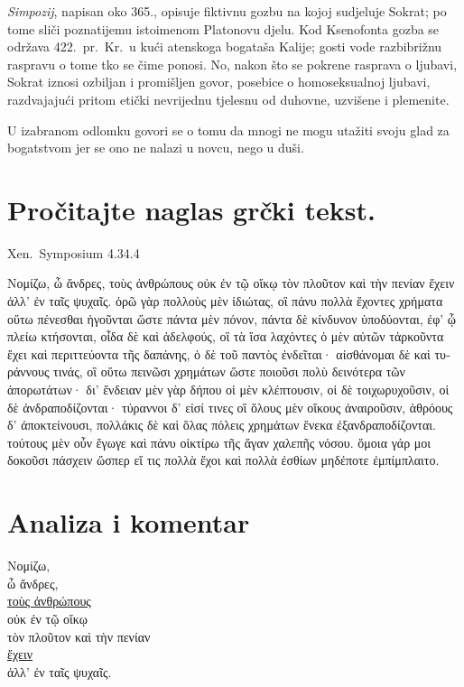 \textit{Simpozij}, napisan oko 365., opisuje fiktivnu gozbu na kojoj sudjeluje Sokrat; po tome sliči poznatijemu istoimenom Platonovu djelu. Kod Ksenofonta gozba se održava 422.\ pr.~Kr.\ u kući atenskoga bogataša Kalije; gosti vode razbibrižnu raspravu o tome tko se čime ponosi. No, nakon što se pokrene rasprava o ljubavi, Sokrat iznosi ozbiljan i promišljen govor, posebice o homoseksualnoj ljubavi, razdvajajući pritom etički nevrijednu tjelesnu od duhovne, uzvišene i plemenite. 

U izabranom odlomku govori se o tomu da mnogi ne mogu utažiti svoju glad za bogatstvom jer se ono ne nalazi u novcu, nego u duši.


\section*{Pročitajte naglas grčki tekst.}

Xen.\ Symposium 4.34.4


\medskip

{\large
\begin{greek}
\noindent Νομίζω, ὦ ἄνδρες, τοὺς ἀνθρώπους οὐκ ἐν τῷ οἴκῳ τὸν πλοῦτον καὶ τὴν πενίαν ἔχειν ἀλλ' ἐν ταῖς ψυχαῖς. ὁρῶ γὰρ πολλοὺς μὲν ἰδιώτας, οἳ πάνυ πολλὰ ἔχοντες χρήματα οὕτω πένεσθαι ἡγοῦνται ὥστε πάντα μὲν πόνον, πάντα δὲ κίνδυνον ὑποδύονται, ἐφ' ᾧ πλείω κτήσονται, οἶδα δὲ καὶ ἀδελφούς, οἳ τὰ ἴσα λαχόντες ὁ μὲν αὐτῶν τἀρκοῦντα ἔχει καὶ περιττεύοντα τῆς δαπάνης, ὁ δὲ τοῦ παντὸς ἐνδεῖται· αἰσθάνομαι δὲ καὶ τυράννους τινάς, οἳ οὕτω πεινῶσι χρημάτων ὥστε ποιοῦσι πολὺ δεινότερα τῶν ἀπορωτάτων· δι' ἔνδειαν μὲν γὰρ δήπου οἱ μὲν κλέπτουσιν, οἱ δὲ τοιχωρυχοῦσιν, οἱ δὲ ἀνδραποδίζονται· τύραννοι δ' εἰσί τινες οἳ ὅλους μὲν οἴκους ἀναιροῦσιν, ἁθρόους δ' ἀποκτείνουσι, πολλάκις δὲ καὶ ὅλας πόλεις χρημάτων ἕνεκα ἐξανδραποδίζονται. τούτους μὲν οὖν ἔγωγε καὶ πάνυ οἰκτίρω τῆς ἄγαν χαλεπῆς νόσου. ὅμοια γάρ μοι δοκοῦσι πάσχειν ὥσπερ εἴ τις πολλὰ ἔχοι καὶ πολλὰ ἐσθίων μηδέποτε ἐμπίμπλαιτο.

\end{greek}

}

\newpage


\section*{Analiza i komentar}


{\large
\noindent Νομίζω, \\
\tabto{2em} ὦ ἄνδρες, \\
\underline{τοὺς ἀνθρώπους} \\
\tabto{2em} οὐκ ἐν τῷ οἴκῳ \\
\tabto{4em} τὸν πλοῦτον καὶ τὴν πενίαν\\
\tabto{4em}  \underline{ἔχειν} \\
\tabto{2em} ἀλλ' ἐν ταῖς ψυχαῖς.\\

}

